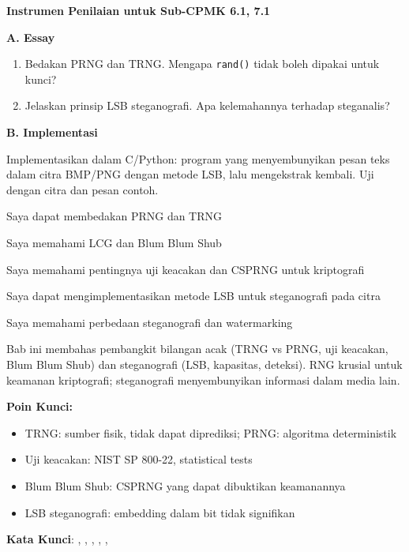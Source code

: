 \documentclass[main.tex]{subfiles}
\begin{document}

\begin{asesmen}
\textbf{Instrumen Penilaian untuk Sub-CPMK 6.1, 7.1}

\textbf{A. Essay}

\begin{enumerate}
  \item Bedakan PRNG dan TRNG. Mengapa \texttt{rand()} tidak boleh dipakai untuk kunci?
  \item Jelaskan prinsip LSB steganografi. Apa kelemahannya terhadap steganalis?
\end{enumerate}

\textbf{B. Implementasi}

Implementasikan dalam C/Python: program yang menyembunyikan pesan teks dalam citra BMP/PNG dengan metode LSB, lalu mengekstrak kembali. Uji dengan citra dan pesan contoh.
\end{asesmen}


\begin{checklist}
  \item Saya dapat membedakan PRNG dan TRNG
  \item Saya memahami LCG dan Blum Blum Shub
  \item Saya memahami pentingnya uji keacakan dan CSPRNG untuk kriptografi
  \item Saya dapat mengimplementasikan metode LSB untuk steganografi pada citra
  \item Saya memahami perbedaan steganografi dan watermarking
\end{checklist}


\begin{rangkuman}
Bab ini membahas pembangkit bilangan acak (TRNG vs PRNG, uji keacakan, Blum Blum Shub) dan steganografi (LSB, kapasitas, deteksi). RNG krusial untuk keamanan kriptografi; steganografi menyembunyikan informasi dalam media lain.

\textbf{Poin Kunci:}
\begin{itemize}
  \item TRNG: sumber fisik, tidak dapat diprediksi; PRNG: algoritma deterministik
  \item Uji keacakan: NIST SP 800-22, statistical tests
  \item Blum Blum Shub: CSPRNG yang dapat dibuktikan keamanannya
  \item LSB steganografi: embedding dalam bit tidak signifikan
\end{itemize}

\textbf{Kata Kunci}: , , , , , 
\end{rangkuman}
\end{document}

